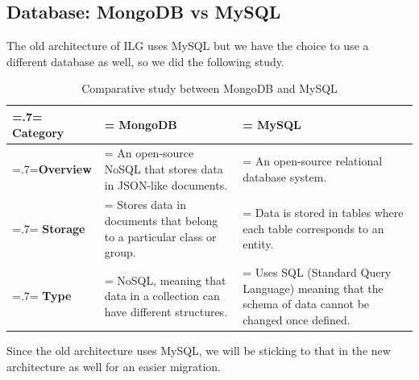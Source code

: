 \subsection{Database: MongoDB vs MySQL}
The old architecture of ILG uses MySQL but we have the choice to use a different database as well, so we did the following study.
\begin{table}[H]
    \renewcommand{\arraystretch}{1.5}%
    \caption{Comparative study between MongoDB and MySQL \cite{mongodb-vs-mysql}}
    \centering
    \medskip
    \begin{tabularx}{1\textwidth} {
            | >{\hsize=.7\hsize\linewidth=\hsize\centering\arraybackslash}X
            | >{\hsize=1.15\hsize\linewidth=\hsize\justifying\arraybackslash}X
            | >{\hsize=1.15\hsize\linewidth=\hsize\justifying\arraybackslash}X |}
        \hline
        \rowcolor{primary} \textbf {Category} & \textbf {MongoDB}                                                                 & \textbf {MySQL}                                                                                              \\
        \hline
        \textbf {Overview}                    & \noindent An open-source NoSQL that stores data in JSON-like documents.           & \noindent An open-source relational database system.                                                         \\
        \hline
        \textbf {Storage}                     & \noindent Stores data in documents that belong to a particular class or group.    & \noindent Data is stored in tables where each table corresponds to an entity.                                \\
        \hline
        \textbf {Type}                        & \noindent NoSQL, meaning that data in a collection can have different structures. & \noindent Uses SQL (Standard Query Language) meaning that the schema of data cannot be changed once defined. \\
        \hline
    \end{tabularx}
\end{table}
Since the old architecture uses MySQL, we will be sticking to that in the new architecture as well for an easier migration.

